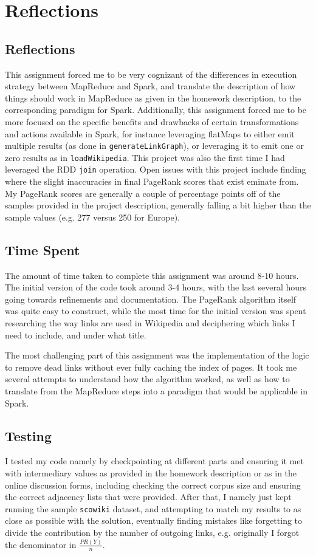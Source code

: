 \documentclass{article}
\begin{document}
\section{Reflections}
\subsection{Reflections}
This assignment forced me to be very cognizant of the differences in execution strategy between MapReduce and Spark, and translate the description of how things should work in MapReduce as given in the homework description, to the corresponding paradigm for Spark.
Additionally, this assignment forced me to be more focused on the specific benefits and drawbacks of certain transformations and actions available in Spark, for instance leveraging flatMaps to either emit multiple results (as done in \texttt{generateLinkGraph}), or leveraging it to emit one or zero results as in \texttt{loadWikipedia}.
This project was also the first time I had leveraged the RDD \texttt{join} operation.
Open issues with this project include finding where the slight inaccuracies in final PageRank scores that exist eminate from. My PageRank scores are generally a couple of percentage points off of the samples provided in the project description, generally falling a bit higher than the sample values (e.g. 277 versus 250 for Europe).
\subsection{Time Spent}
The amount of time taken to complete this assignment was around 8-10 hours. The initial version of the code took around 3-4 hours, with the last several hours going towards refinements and documentation. The PageRank algorithm itself was quite easy to construct, while the most time for the initial version was spent researching the way links are used in Wikipedia and deciphering which links I need to include, and under what title.

The most challenging part of this assignment was the implementation of the logic to remove dead links without ever fully caching the index of pages.
It took me several attempts to understand how the algorithm worked, as well as how to translate from the MapReduce steps into a paradigm that would be applicable in Spark.

\subsection{Testing}
I tested my code namely by checkpointing at different parts and ensuring it met with intermediary values as provided in the homework description or as in the online discussion forms, including checking the correct corpus size and ensuring the correct adjacency lists that were provided.
After that, I namely just kept running the sample \texttt{scowiki} dataset, and attempting to match my results to as close as possible with the solution, eventually finding mistakes like forgetting to divide the contribution by the number of outgoing links, e.g. originally I forgot the denominator in $\frac{PR(Y)}{n}$.
\end{document}
